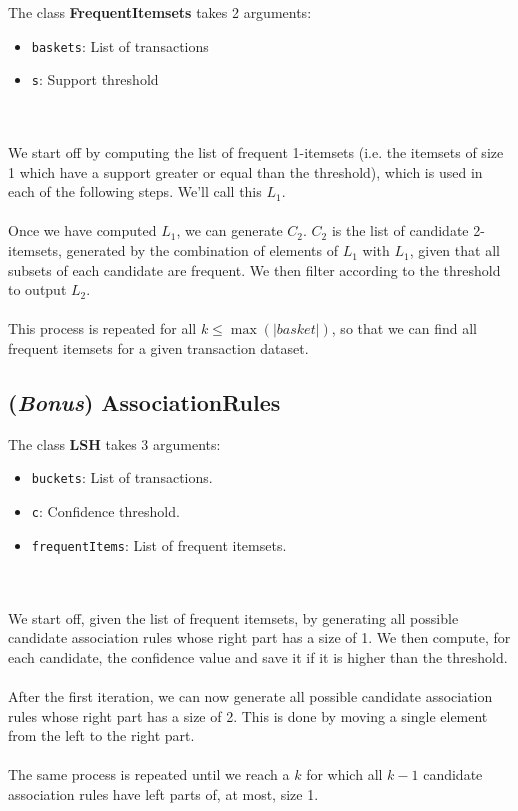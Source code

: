 \documentclass[]{article}
\begin{document}
The class \textbf{FrequentItemsets} takes 2 arguments:
\begin{itemize}
    \item \texttt{baskets}: List of transactions
  \item \texttt{s}: Support threshold
\end{itemize}\\
\\
We start off by computing the list of frequent 1-itemsets (i.e. the itemsets of size 1 which have a support greater or equal than the threshold), which is used in each of the following steps. We'll call this $L_1$.\\
\\
Once we have computed $L_1$, we can generate $C_2$. $C_2$ is the list of candidate 2-itemsets, generated by the combination of elements of $L_1$ with $L_1$, given that all subsets of each candidate are frequent. We then filter according to the threshold to output $L_2$.\\
\\
This process is repeated for all $k \le \max(|basket|)$, so that we can find all frequent itemsets for a given transaction dataset.

\pagebreak

\subsection{(\textit{Bonus}) AssociationRules}

The class \textbf{LSH} takes 3 arguments:
\begin{itemize}
    \item \texttt{buckets}: List of transactions.
    \item \texttt{c}: Confidence threshold.
    \item \texttt{frequentItems}: List of frequent itemsets.
\end{itemize}\\
\\
We start off, given the list of frequent itemsets, by generating all possible candidate association rules whose right part has a size of 1. We then compute, for each candidate, the confidence value and save it if it is higher than the threshold.\\
\\
After the first iteration, we can now generate all possible candidate association rules whose right part has a size of 2. This is done by moving a single element from the left to the right part.\\
\\
The same process is repeated until we reach a $k$ for which all $k-1$ candidate association rules have left parts of, at most, size 1.
\end{document}

